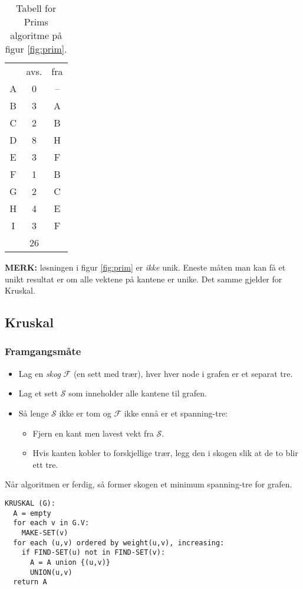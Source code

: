 \documentclass[11pt,a4paper]{article}
\theoremstyle{def}
\begin{document}
\begin{table}
\centering
\begin{tabular}{ccc}
&avs.&fra\\
A&0&--\\
B&3&A\\
C&2&B\\
D&8&H\\
E&3&F\\
F&1&B\\
G&2&C\\
H&4&E\\
I&3&F\\
\cline{2-2}
&26&\\
\cline{2-2}
\end{tabular}
\caption{Tabell for Prims algoritme på figur \ref{fig:prim}.}
\end{table}

\textbf{MERK:} løsningen i figur \ref{fig:prim} er \textit{ikke} unik. Eneste måten man kan få et unikt resultat er om alle vektene på kantene er unike. Det samme gjelder for Kruskal.

\newpage

\subsection{Kruskal}
\subsubsection{Framgangsmåte}
\begin{itemize}
\item
Lag en \textit{skog} $\mathcal{F}$ (en sett med trær), hver hver node i grafen er et separat tre.
\item
Lag et sett $\mathcal{S}$ som inneholder alle kantene til grafen.
\item
Så lenge $\mathcal{S}$ ikke er tom og $\mathcal{F}$ ikke ennå er et spanning-tre:
\begin{itemize}
\item
Fjern en kant men lavest vekt fra $\mathcal{S}$.
\item
Hvis kanten kobler to forskjellige trær, legg den i skogen slik at de to blir ett tre.
\end{itemize}
\end{itemize}
Når algoritmen er ferdig, så former skogen et minimum spanning-tre for grafen. 

\begin{Verbatim}[frame=single]
KRUSKAL (G):
  A = empty
  for each v in G.V:
    MAKE-SET(v)
  for each (u,v) ordered by weight(u,v), increasing:
    if FIND-SET(u) not in FIND-SET(v):
      A = A union {(u,v)}
      UNION(u,v)
  return A
\end{Verbatim}
\end{document}
